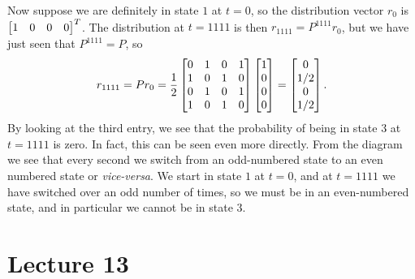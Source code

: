 \documentclass[a4paper]{amsart}
\renewenvironment{solution}{\SolutionInline}{\endSolutionInline}
\begin{document}
\begin{solution}
 Now suppose we are definitely in state $1$ at $t=0$, so the
 distribution vector $r_0$ is $\left[\begin{matrix} 1 & 0 & 0 & 0 \end{matrix}\right]^T$.  The
 distribution at $t=1111$ is then $r_{1111}=P^{1111}r_0$, but we have
 just seen that $P^{1111}=P$, so 
 \[ r_{1111} = Pr_0 =
    \frac{1}{2}
     \left[\begin{matrix} 
      0 & 1 & 0 & 1 \\
      1 & 0 & 1 & 0 \\
      0 & 1 & 0 & 1 \\
      1 & 0 & 1 & 0
     \end{matrix}\right]
     \left[\begin{matrix} 1 \\ 0 \\ 0 \\ 0 \end{matrix}\right] =
     \left[\begin{matrix} 0 \\ 1/2 \\ 0 \\ 1/2 \end{matrix}\right].
 \]
 By looking at the third entry, we see that the probability of being
 in state $3$ at $t=1111$ is zero.  In fact, this can be seen even
 more directly.  From the diagram we see that every second we switch
 from an odd-numbered state to an even numbered state or
 \emph{vice-versa}.  We start in state $1$ at $t=0$, and at $t=1111$ we
 have switched over an odd number of times, so we must be in an
 even-numbered state, and in particular we cannot be in state $3$.
\end{solution}

\section{Lecture 13}
\end{document}
